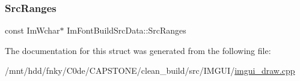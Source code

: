\mbox{\label{structImFontBuildSrcData_a30187b934b16d7bef600887f1cc6614f}} 
\subsubsection{\texorpdfstring{Src\+Ranges}{SrcRanges}}
{\footnotesize\ttfamily const Im\+Wchar$\ast$ Im\+Font\+Build\+Src\+Data\+::\+Src\+Ranges}



The documentation for this struct was generated from the following file\+:\begin{DoxyCompactItemize}
\item 
/mnt/hdd/fnky/\+C0de/\+C\+A\+P\+S\+T\+O\+N\+E/clean\+\_\+build/src/\+I\+M\+G\+U\+I/\hyperlink{imgui__draw_8cpp}{imgui\+\_\+draw.\+cpp}\end{DoxyCompactItemize}
